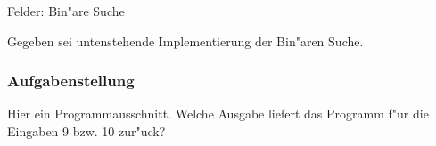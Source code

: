 \begin{frame}[t]%
\begin{exercise}{Felder: Bin"are Suche}

\begin{body}
Gegeben sei untenstehende Implementierung der Bin"aren Suche.


\end{body}
\end{exercise}
\end{frame}


\begin{frame}
 \frametitle{Aufgabenstellung}%
\medskip

Hier ein Programmausschnitt.
Welche Ausgabe liefert das Programm f"ur die Eingaben 9 bzw. 10 zur"uck?

\end{frame}
